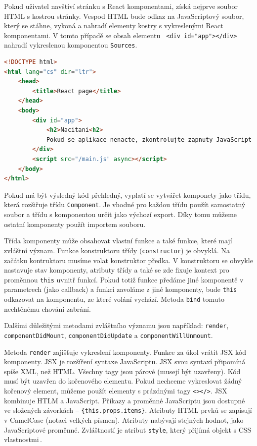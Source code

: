 Pokud uživatel navštíví stránku s React komponentami, získá nejprve soubor HTML s kostrou stránky. Vespod HTML bude odkaz na JavaScriptový soubor, který se stáhne, vykoná a nahradí elementy kostry s vykreslenými React komponentami. V tomto případě se obsah elementu \texttt{ <div id="{}app"{}></div>} nahradí vykreslenou komponentou \texttt{Sources}.
\begin{lstlisting}[language=HTML]
<!DOCTYPE html>
<html lang="cs" dir="ltr">
    <head>
        <title>React page</title>
    </head>
    <body>
        <div id="app">
            <h2>Nacitani<h2>
            Pokud se aplikace nenacte, zkontrolujte zapnuty JavaScript
        </div>
        <script src="/main.js" async></script>
    </body>
</html>
\end{lstlisting}

Pokud má být výsledný kód přehledný, vyplatí se vytvářet komponety jako třídu, která rozšiřuje třídu \texttt{Component}. Je vhodné pro každou třídu použít samostatný soubor a třídu s komponentou určit jako výchozí export. Díky tomu můžeme ostatní komponenty použít importem souboru.

Třída komponenty může obsahovat vlastní funkce a také funkce, které mají zvláštní význam. Funkce konstruktoru třídy (\texttt{constructor}) je obvyklá. Na začátku kontruktoru musíme volat konstruktor předka. V konstruktoru se obvykle nastavuje stav komponenty, atributy třídy a také se zde fixuje kontext pro proměnnou \texttt{this} uvnitř funkcí. Pokud totiž funkce předáme jiné komponentě v parametrech (jako callback) a funkci zavoláme z jiné komponenty, bude \texttt{this} odkazovat na komponentu, ze které volání vychází. Metoda \texttt{bind} tomuto nechtěnému chování zabrání.

Dalšími důležitými metodami zvláštního významu jsou například: \texttt{render}, \texttt{componentDidMount}, \texttt{componentDidUpdate} a \texttt{componentWillUnmount}.

Metoda \texttt{render} zajišťuje vykreslení komponenty. Funkce za úkol vrátit JSX kód komponenty. JSX je rozšíření syntaxe JavaScriptu. JSX svou syntaxí připomíná spíše XML, než HTML. Všechny tagy jsou párové (musejí být uzavřeny). Kód musí být uzavřen do kořenového elementu. Pokud nechceme vykreslovat žádný kořenový element, můžeme použít elementy s prázdnými tagy \texttt{<></>}. JSX kombinuje HTLM a JavaScript. Příkazy a proměnné JavaScriptu jsou dostupné ve složených závorkách -- \texttt{\{this.props.items\}}. Atributy HTML prvků se zapisují v CamelCase (notaci velkých písmen). Atributy nabývají stejných hodnot, jako JavaScriptové proměnné. Zvláštností je atribut \texttt{style}, který přijímá objekt s CSS vlastnostmi\,\cite{jsx}.

